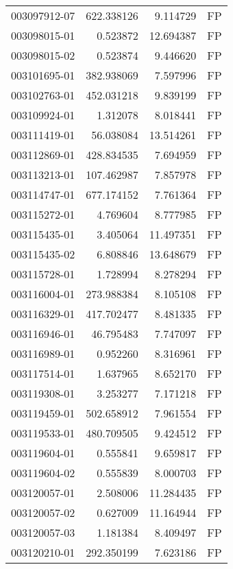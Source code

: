 \begin{tabular}{lrrl}
003097912-07 &  622.338126 &       9.114729 &   FP \\
003098015-01 &    0.523872 &      12.694387 &   FP \\
003098015-02 &    0.523874 &       9.446620 &   FP \\
003101695-01 &  382.938069 &       7.597996 &   FP \\
003102763-01 &  452.031218 &       9.839199 &   FP \\
003109924-01 &    1.312078 &       8.018441 &   FP \\
003111419-01 &   56.038084 &      13.514261 &   FP \\
003112869-01 &  428.834535 &       7.694959 &   FP \\
003113213-01 &  107.462987 &       7.857978 &   FP \\
003114747-01 &  677.174152 &       7.761364 &   FP \\
003115272-01 &    4.769604 &       8.777985 &   FP \\
003115435-01 &    3.405064 &      11.497351 &   FP \\
003115435-02 &    6.808846 &      13.648679 &   FP \\
003115728-01 &    1.728994 &       8.278294 &   FP \\
003116004-01 &  273.988384 &       8.105108 &   FP \\
003116329-01 &  417.702477 &       8.481335 &   FP \\
003116946-01 &   46.795483 &       7.747097 &   FP \\
003116989-01 &    0.952260 &       8.316961 &   FP \\
003117514-01 &    1.637965 &       8.652170 &   FP \\
003119308-01 &    3.253277 &       7.171218 &   FP \\
003119459-01 &  502.658912 &       7.961554 &   FP \\
003119533-01 &  480.709505 &       9.424512 &   FP \\
003119604-01 &    0.555841 &       9.659817 &   FP \\
003119604-02 &    0.555839 &       8.000703 &   FP \\
003120057-01 &    2.508006 &      11.284435 &   FP \\
003120057-02 &    0.627009 &      11.164944 &   FP \\
003120057-03 &    1.181384 &       8.409497 &   FP \\
003120210-01 &  292.350199 &       7.623186 &   FP \\

\end{tabular}
